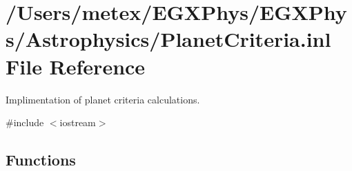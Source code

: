\hypertarget{_planet_criteria_8inl}{}\section{/\+Users/metex/\+E\+G\+X\+Phys/\+E\+G\+X\+Phys/\+Astrophysics/\+Planet\+Criteria.inl File Reference}
\label{_planet_criteria_8inl}


Implimentation of planet criteria calculations.  


{\ttfamily \#include $<$iostream$>$}\newline
\subsection*{Functions}
